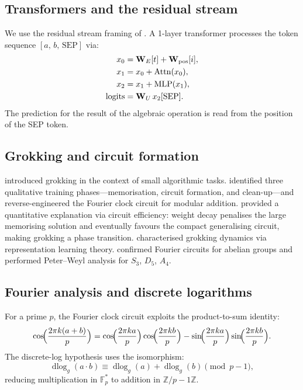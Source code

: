 \documentclass[11pt]{article}
\newcommand{\Z}[1]{\mathbb{Z}/{#1}\mathbb{Z}}
\newcommand{\W}[1]{\mathbf{W}_{#1}}
\newcommand{\dlog}{\operatorname{dlog}}
\begin{document}
\subsection{Transformers and the residual stream}

We use the residual stream framing of \citet{elhage2021mathematical}.
A 1-layer transformer processes the token sequence $[a,\,b,\,\text{SEP}]$
via:
\begin{align}
  x_0 &= \W{E}[t] + \W{\mathrm{pos}}[i], \notag\\
  x_1 &= x_0 + \mathrm{Attn}(x_0), \notag\\
  x_2 &= x_1 + \mathrm{MLP}(x_1), \notag\\
  \text{logits} &= \W{U}\,x_2[\text{SEP}]. \notag
\end{align}
The prediction for the result of the algebraic operation is read from
the position of the SEP token.

\subsection{Grokking and circuit formation}

\citet{power2022grokking} introduced grokking in the context of small
algorithmic tasks. \citet{nanda2023progress} identified three qualitative
training phases---memorisation, circuit formation, and clean-up---and
reverse-engineered the Fourier clock circuit for modular addition.
\citet{varma2023explaining} provided a quantitative explanation via circuit
efficiency: weight decay penalises the large memorising solution and
eventually favours the compact generalising circuit, making grokking a
phase transition. \citet{liu2022towards} characterised grokking dynamics
via representation learning theory. \citet{chughtai2023toy} confirmed
Fourier circuits for abelian groups and performed Peter--Weyl analysis
for $S_3$, $D_5$, $A_4$.

\subsection{Fourier analysis and discrete logarithms}

For a prime $p$, the Fourier clock circuit exploits the product-to-sum
identity:
\begin{equation}
  \cos\!\Bigl(\frac{2\pi k(a+b)}{p}\Bigr)
  = \cos\!\Bigl(\frac{2\pi ka}{p}\Bigr)\cos\!\Bigl(\frac{2\pi kb}{p}\Bigr)
  - \sin\!\Bigl(\frac{2\pi ka}{p}\Bigr)\sin\!\Bigl(\frac{2\pi kb}{p}\Bigr).
  \label{eq:trig}
\end{equation}
The discrete-log hypothesis \citep{nanda2023progress} uses the isomorphism:
\begin{equation}
  \dlog_g(a \cdot b) \equiv \dlog_g(a) + \dlog_g(b) \pmod{p-1},
  \label{eq:dlog}
\end{equation}
reducing multiplication in $\mathbb{F}_p^*$ to addition in $\Z{p-1}$.
\end{document}
